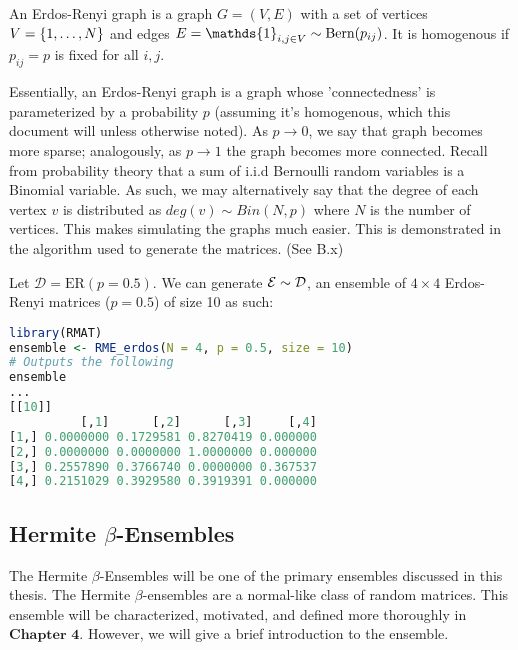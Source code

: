 \begin{definition}
An Erdos-Renyi graph is a graph $G = (V,E)$ with a set of vertices $V = \{\oneto[N]\}$ and edges $E = \mathds{1}_{i,j \in V} \sim \Bern(p_{ij})$. It is homogenous if $p_{ij} = p$ is fixed for all $i, j$.
\end{definition}

Essentially, an Erdos-Renyi graph is a graph whose 'connectedness' is parameterized by a probability $p$ (assuming it's homogenous, which this document will unless otherwise noted). As $p \to 0$, we say that graph becomes more sparse; analogously, as $p \to 1$ the graph becomes more connected.\newline
\indent Recall from probability theory that a sum of i.i.d Bernoulli random variables is a Binomial variable. As such, we may alternatively say that the degree of each vertex $v$ is distributed as $deg(v) \sim Bin(N,p)$ where $N$ is the number of vertices. This makes simulating the graphs much easier. This is demonstrated in the algorithm used to generate the matrices.  (See B.x)

\begin{code}[Erdos-Renyi p = 0.5 Ensemble]
Let $\mathcal{D} = \text{ER}(p = 0.5)$. We can generate $\Ens \sim \D$, an ensemble of $4 \times 4$ Erdos-Renyi matrices ($p = 0.5$) of size 10 as such:
\end{code}

\begin{lstlisting}[language=R]
library(RMAT)
ensemble <- RME_erdos(N = 4, p = 0.5, size = 10)
# Outputs the following
ensemble
...
[[10]]
          [,1]      [,2]      [,3]     [,4]
[1,] 0.0000000 0.1729581 0.8270419 0.000000
[2,] 0.0000000 0.0000000 1.0000000 0.000000
[3,] 0.2557890 0.3766740 0.0000000 0.367537
[4,] 0.2151029 0.3929580 0.3919391 0.000000
\end{lstlisting}


\subsection{Hermite $\beta$-Ensembles}

The Hermite $\beta$-Ensembles will be one of the primary ensembles discussed in this thesis. The Hermite $\beta$-ensembles are a normal-like class of random matrices. This ensemble will be characterized, motivated, and defined more thoroughly in $\textbf{Chapter 4}$. However, we will give a brief introduction to the ensemble.

